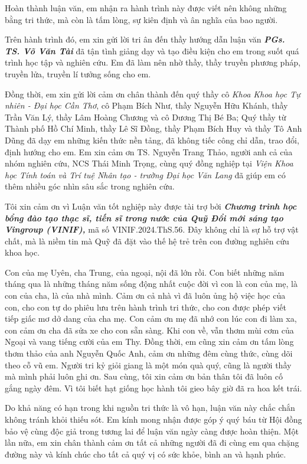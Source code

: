 Hoàn thành luận văn, em nhận ra hành trình này được viết nên không những bằng tri thức, mà còn là tấm lòng, sự kiên định và ân nghĩa của bao người.

Trên hành trình đó, em xin gửi lời tri ân đến thầy hướng dẫn luận văn \textit{\textbf{PGs. TS. Võ Văn Tài}} đã tận tình giảng dạy và tạo điều kiện cho em trong suốt quá trình học tập và nghiên cứu. Em đã làm nên nhờ thầy, thầy truyền phương pháp, truyền lửa, truyền lí tưởng sống cho em. 

Đồng thời, em xin gửi lời cảm ơn chân thành đến quý thầy cô \textit{Khoa Khoa học Tự nhiên - Đại học Cần Thơ}, cô Phạm Bích Như, thầy Nguyễn Hữu Khánh, thầy Trần Văn Lý, thầy Lâm Hoàng Chương và cô Dương Thị Bé Ba; Quý thầy từ Thành phố Hồ Chí Minh, thầy Lê Sĩ Đồng, thầy Phạm Bích Huy và thầy Tô Anh Dũng đã dạy em những kiến thức nền tảng, đã không tiếc công chỉ dẫn, trao đổi, định hướng cho em. Em xin cảm ơn TS. Nguyễn Trang Thảo, người anh cả của nhóm nghiên cứu, NCS Thái Minh Trọng, cùng quý đồng nghiệp tại \textit{Viện Khoa học Tính toán và Trí tuệ Nhân tạo - trường Đại học Văn Lang} đã giúp em có thêm nhiều góc nhìn sâu sắc trong nghiên cứu.

Tôi xin cảm ơn vì Luận văn tốt nghiệp này được tài trợ bởi \textbf{\textit{Chương trình học bổng đào tạo thạc sĩ, tiến sĩ trong nước của Quỹ Đổi mới sáng tạo Vingroup (VINIF),}} mã số VINIF.2024.ThS.56. Đây không chỉ là sự hỗ trợ vật chất, mà là niềm tin mà Quỹ đã đặt vào thế hệ trẻ trên con đường nghiên cứu khoa học.

Con của mẹ Uyên, cha Trung, của ngoại, nội đã lớn rồi. Con biết những năm tháng qua là những tháng năm sống động nhất cuộc đời vì con là con của mẹ, là con của cha, là của nhà mình. Cảm ơn cả nhà vì đã luôn ủng hộ việc học của con, cho con tự do phiêu lưu trên hành trình tri thức, cho con được phép viết tiếp giấc mơ dở dang của cha mẹ. Con cảm ơn mẹ đã nhớ con lúc con đi làm xa, con cảm ơn cha đã sửa xe cho con sẵn sàng. Khi con về, vẫn thơm mùi cơm của Ngoại và vang tiếng cười của em Thy. Đồng thời, em cũng xin cảm ơn tấm lòng thơm thảo của anh Nguyễn Quốc Anh, cảm ơn những đêm cùng thức, cùng dõi theo cỗ vũ em. Người tri kỷ giỏi giang là một món quà quý, cũng là người thầy mà mình phải luôn ghi ơn. Sau cùng, tôi xin cảm ơn bản thân tôi đã luôn cố gắng ngày đêm. Vì tôi biết hạt giống học hành tôi gieo bây giờ đã ra hoa kết trái.
 
Do khả năng có hạn trong khi nguồn tri thức là vô hạn, luận văn này chắc chắn không tránh khỏi thiếu sót. Em kính mong nhận được góp ý quý báu từ Hội đồng bảo vệ cùng độc giả trong tương lai để luận văn ngày càng được hoàn thiện. Một lần nữa, em xin chân thành cảm ơn tất cả những người đã đi cùng em qua chặng đường này và kính chúc cho tất cả quý vị có sức khỏe, bình an và hạnh phúc.




